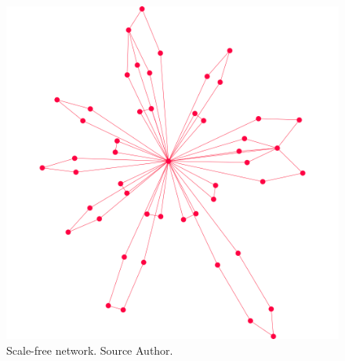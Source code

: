 \documentclass[preprint,12pt, a4paper]{elsarticle}
\begin{document}
\begin{figure}[!htbp]
    \begin{center}
        \includegraphics[scale=0.3]{images/scalefree.png}
    \end{center}
    \caption{Scale-free network. Source Author.}
    \label{fig:scalefree}
\end{figure}
\end{document}
